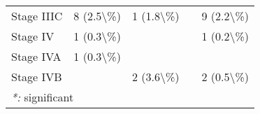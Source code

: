 \documentclass[
]{article}
\begin{document}
\begin{longtable}[t]{lllll}
\hspace{1em}Stage IIIC & 8 (2.5\textbackslash{}\%) & 1 (1.8\textbackslash{}\%) &  & 9 (2.2\textbackslash{}\%)\\
\hspace{1em}Stage IV & 1 (0.3\textbackslash{}\%) &  &  & 1 (0.2\textbackslash{}\%)\\
\hspace{1em}Stage IVA & 1 (0.3\textbackslash{}\%) &  &  & \\
\hspace{1em}Stage IVB &  & 2 (3.6\textbackslash{}\%) &  & 2 (0.5\textbackslash{}\%)\\
\bottomrule
\multicolumn{5}{l}{\rule{0pt}{1em}\textit{*: } significant}\\
\end{longtable}

\newpage
\end{document}
